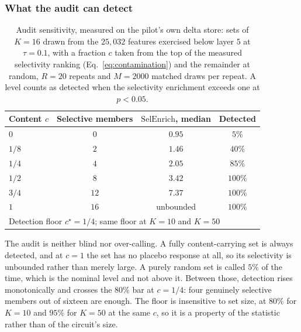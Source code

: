 \subsubsection{What the audit can detect}

\begin{table}[t]
\caption{Audit sensitivity, measured on the pilot's own delta store: sets of
$K=16$ drawn from the $25{,}032$ features exercised below layer $5$ at
$\tau=0.1$, with a fraction $c$ taken from the top of the measured selectivity
ranking (Eq.~\ref{eq:contamination}) and the remainder at random, $R=20$
repeats and $M=2000$ matched draws per repeat. A level counts as detected when
the selectivity enrichment exceeds one at $p<0.05$.}
\label{tab:cf-calibration}
\begin{center}
\small
\begin{tabular}{lccc}
\hline
Content $c$ & Selective members & $\mathrm{SelEnrich}$, median & Detected \\
\hline
$0$            & $0$  & $0.95$   & $5\%$   \\
$1/8$          & $2$  & $1.46$   & $40\%$  \\
$1/4$          & $4$  & $2.05$   & $85\%$  \\
$1/2$          & $8$  & $3.42$   & $100\%$ \\
$3/4$          & $12$ & $7.37$   & $100\%$ \\
$1$            & $16$ & unbounded & $100\%$ \\
\hline
\multicolumn{4}{l}{Detection floor $c^{\star}=1/4$; same floor at $K=10$ and $K=50$} \\
\hline
\end{tabular}
\end{center}
\end{table}

The audit is neither blind nor over-calling. A fully content-carrying set is
always detected, and at $c=1$ the set has no placebo response at all, so its
selectivity is unbounded rather than merely large. A purely random set is
called $5\%$ of the time, which is the nominal level and not above it. Between
those, detection rises monotonically and crosses the $80\%$ bar at $c=1/4$:
four genuinely selective members out of sixteen are enough. The floor is
insensitive to set size, at $80\%$ for $K=10$ and $95\%$ for $K=50$ at the same
$c$, so it is a property of the statistic rather than of the circuit's size.

